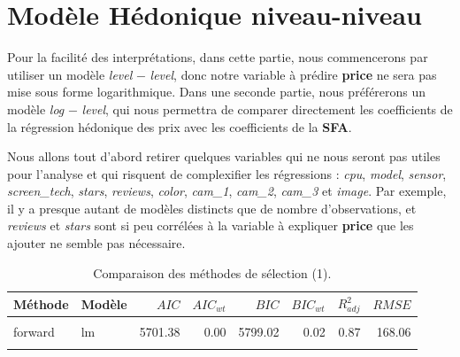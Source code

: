 \documentclass[
  12pt,
]{report}
\begin{document}
\newpage

\section{Modèle Hédonique
niveau-niveau}\label{moduxe8le-huxe9donique-niveau-niveau}

Pour la facilité des interprétations, dans cette partie, nous
commencerons par utiliser un modèle \emph{level} \(-\) \emph{level},
donc notre variable à prédire \textbf{price} ne sera pas mise sous forme
logarithmique. Dans une seconde partie, nous préférerons un modèle
\emph{log} \(-\) \emph{level}, qui nous permettra de comparer
directement les coefficients de la régression hédonique des prix avec
les coefficients de la \textbf{SFA}.

Nous allons tout d'abord retirer quelques variables qui ne nous seront
pas utiles pour l'analyse et qui risquent de complexifier les
régressions : \emph{cpu}, \emph{model}, \emph{sensor},
\emph{screen\_tech}, \emph{stars}, \emph{reviews}, \emph{color},
\emph{cam\_1}, \emph{cam\_2}, \emph{cam\_3} et \emph{image}. Par
exemple, il y a presque autant de modèles distincts que de nombre
d'observations, et \emph{reviews} et \emph{stars} sont si peu corrélées
à la variable à expliquer \textbf{price} que les ajouter ne semble pas
nécessaire.

\begin{table}[!h]

\caption{\label{tab:kable_perf}Comparaison des méthodes de sélection (1).}
\centering
\begin{tabular}[t]{llrrrrrr}
\toprule
\textbf{Méthode} & \textbf{Modèle} & \textbf{$AIC$} & \textbf{$AIC_{wt}$} & \textbf{$BIC$} & \textbf{$BIC_{wt}$} & \textbf{$R^2_{adj}$} & \textbf{$RMSE$}\\
\midrule
\cellcolor{gray!6}{backward} & \cellcolor{gray!6}{lm} & \cellcolor{gray!6}{5690.77} & \cellcolor{gray!6}{0.99} & \cellcolor{gray!6}{5800.62} & \cellcolor{gray!6}{0.01} & \cellcolor{gray!6}{0.88} & \cellcolor{gray!6}{164.86}\\
forward & lm & 5701.38 & 0.00 & 5799.02 & 0.02 & 0.87 & 168.06\\
\cellcolor{gray!6}{genetic} & \cellcolor{gray!6}{lm} & \cellcolor{gray!6}{5705.54} & \cellcolor{gray!6}{0.00} & \cellcolor{gray!6}{5790.98} & \cellcolor{gray!6}{0.97} & \cellcolor{gray!6}{0.87} & \cellcolor{gray!6}{170.05}\\
\bottomrule
\end{tabular}
\end{table}
\end{document}
